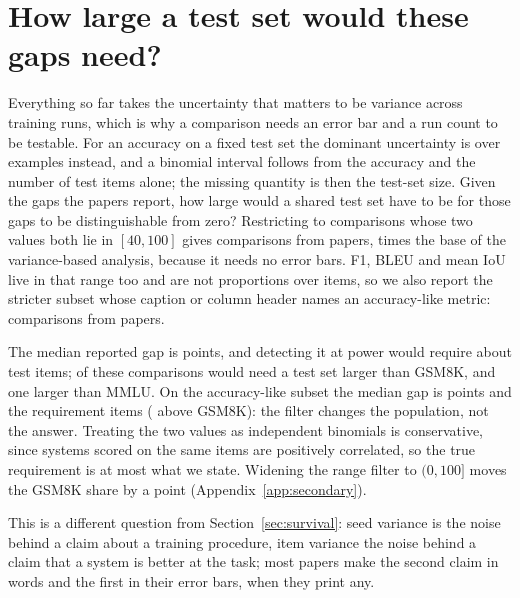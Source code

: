 \documentclass{article}
\begin{document}
\section{How large a test set would these gaps need?}
\label{sec:binomial}

Everything so far takes the uncertainty that matters to be variance across
training runs, which is why a comparison needs an error bar and a run count to
be testable. For an accuracy on a fixed test set the dominant uncertainty is
over examples instead, and a binomial interval follows from the accuracy and
the number of test items alone; the missing quantity is then the test-set
size. Given the gaps the papers report, how large would a shared test set have
to be for those gaps to be distinguishable from zero? Restricting to comparisons
whose two values both lie in $[40, 100]$ gives \nBinomComparisons{} comparisons
from \nBinomPapers{} papers, \nBinomBaseRatio{} times the base of the
variance-based analysis, because it needs no error bars. F1, BLEU and mean IoU live in that
range too and are not proportions over items, so we also report the stricter
subset whose caption or column header names an accuracy-like metric:
\nBinomNamedComparisons{} comparisons from \nBinomNamedPapers{} papers.

The median reported gap is \nBinomMedianGap{} points, and detecting it at
\nPowerLevel{} power would require about \nBinomMedianN{} test items;
\nBinomOverGsm{} of these comparisons would need a test set larger than GSM8K,
and \nBinomOverMmlu{} one larger than MMLU. On the accuracy-like subset the median gap is \nBinomNamedMedianGap{} points
and the requirement \nBinomNamedMedianN{} items (\nBinomNamedOverGsm{} above
GSM8K): the filter changes the population, not the answer.
Treating the two values as independent binomials is conservative, since systems
scored on the same items are positively correlated, so the true requirement is
at most what we state. Widening the range filter to $(0, 100]$ moves the GSM8K
share by a point (Appendix~\ref{app:secondary}).

This is a different question from Section~\ref{sec:survival}: seed variance
is the noise behind a claim about a training procedure, item variance the
noise behind a claim that a system is better at the task; most papers make
the second claim in words and the first in their error bars, when they print
any.
\end{document}
